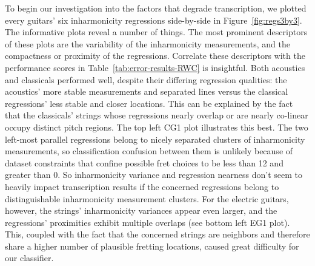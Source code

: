 \documentclass[12pt]{cmuthesis}
\begin{document}
To begin our investigation into the factors that degrade transcription, we plotted every guitars' six inharmonicity regressions side-by-side in Figure~\ref{fig:regs3by3}. The informative plots reveal a number of things. The most prominent descriptors of these plots are the variability of the inharmonicity measurements, and the compactness or proximity of the regressions. Correlate these descriptors with the performance scores in Table~\ref{tab:error-results-RWC} is insightful. Both acoustics and classicals performed well, despite their differing regression qualities: the acoustics' more stable measurements and separated lines versus the classical regressions' less stable and closer locations. This can be explained by the fact that the classicals' strings whose regressions nearly overlap or are nearly co-linear occupy distinct pitch regions. The top left CG1 plot illustrates this best. The two left-most parallel regressions belong to nicely separated clusters of inharmonicity measurements, so classification confusion between them is unlikely because of dataset constraints that confine possible fret choices to be less than 12 and greater than 0. So inharmonicity variance and regression nearness don't seem to heavily impact transcription results if the concerned regressions belong to distinguishable inharmonicity measurement clusters. For the electric guitars, however, the strings' inharmonicity variances appear even larger, and the regressions' proximities exhibit multiple overlaps (see bottom left EG1 plot). This, coupled with the fact that the concerned strings are neighbors and therefore share a higher number of plausible fretting locations, caused great difficulty for our classifier.

\end{document}
